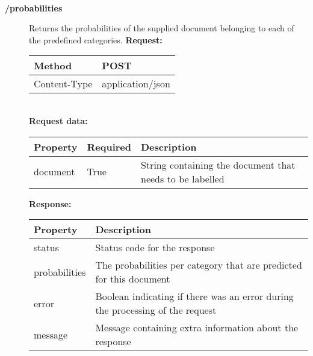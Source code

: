 \begin{description}
\begin{tabular}{ | l | l |}
\end{tabular}\\
\item[{\large \textbf{/probabilities}}]
Returns the probabilities of the supplied document belonging to each of the predefined categories. 
\newline
\newline
\textbf{Request:}
\newline
\newline
\begin{tabular}{ | l | l |}
\hline
Method & POST\\ \hline
Content-Type & application/json\\ \hline
\end{tabular}
\\
\textbf{Request data:}
\newline
\newline
\begin{tabular}{ | l | l | l |}
\hline
\textbf{Property} & \textbf{Required} & \textbf{Description}\\ \hline
document & True & String containing the document that needs to be labelled\\ \hline
\end{tabular}
\newline
\newline
\textbf{Response:}
\newline
\newline
\begin{tabular}{ | l | l |}
\hline
\textbf{Property} & \textbf{Description}\\ \hline
status & Status code for the response\\ \hline
probabilities & The probabilities per category that are predicted for this document\\ \hline
error & Boolean indicating if there was an error during the processing of the request\\ \hline
message & Message containing extra information about the response\\ \hline
\end{tabular}
\end{description}